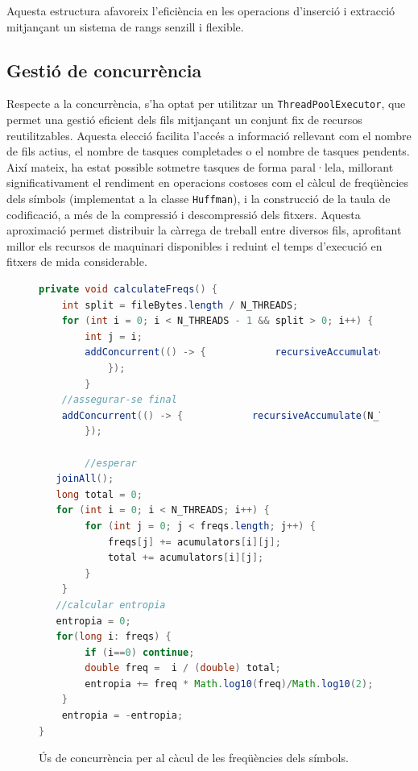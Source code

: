 \documentclass{ieeetj}
\begin{document}
Aquesta estructura afavoreix l’eficiència en les operacions d’inserció i extracció mitjançant un sistema de rangs senzill i flexible.


\subsection{Gestió de concurrència}

Respecte a la concurrència, s'ha optat per utilitzar un \texttt{ThreadPoolExecutor}, que permet una gestió eficient dels fils mitjançant un conjunt fix de recursos reutilitzables. Aquesta elecció facilita l'accés a informació rellevant com el nombre de fils actius, el nombre de tasques completades o el nombre de tasques pendents. Així mateix, ha estat possible sotmetre tasques de forma paral·lela, millorant significativament el rendiment en operacions costoses com el càlcul de freqüències dels símbols (implementat a la classe \texttt{Huffman}), i la construcció de la taula de codificació, a més de la compressió i descompressió dels fitxers. Aquesta aproximació permet distribuir la càrrega de treball entre diversos fils, aprofitant millor els recursos de maquinari disponibles i reduint el temps d'execució en fitxers de mida considerable.


\begin{figure}[H]
    \centering
\begin{lstlisting}[language=Java, basicstyle=\ttfamily\small]
private void calculateFreqs() {
    int split = fileBytes.length / N_THREADS;
    for (int i = 0; i < N_THREADS - 1 && split > 0; i++) {
        int j = i;
        addConcurrent(() -> {            recursiveAccumulate(j, j * split, (j + 1) * split);
            });
        }
    //assegurar-se final
    addConcurrent(() -> {            recursiveAccumulate(N_THREADS - 1, (N_THREADS - 1) * split, fileBytes.length);
        });

        //esperar
   joinAll();
   long total = 0;
   for (int i = 0; i < N_THREADS; i++) {
        for (int j = 0; j < freqs.length; j++) {
            freqs[j] += acumulators[i][j];
            total += acumulators[i][j];
        }
    }
   //calcular entropia
   entropia = 0;
   for(long i: freqs) {
        if (i==0) continue;
        double freq =  i / (double) total;
        entropia += freq * Math.log10(freq)/Math.log10(2);
    }
    entropia = -entropia;
}
    \end{lstlisting}
    \caption{Ús de concurrència per al càcul de les freqüències dels símbols.}
\end{figure}
\end{document}
